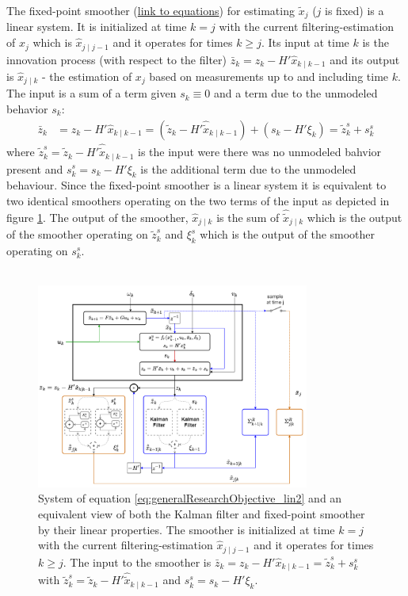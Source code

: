 \documentclass[oneside,12pt]{article}
\begin{document}
%
The fixed-point smoother (\href{https://technionmail-my.sharepoint.com/:b:/g/personal/ron_teichner_campus_technion_ac_il/EQjFqjBlxRxLsoQEzqjmZdAB2D_O3BBw_feZhde7ShqzAA?e=XATenX}{link to equations}) for estimating $\tilde{x}_j$ ($j$ is fixed) is a linear system. It is initialized at time $k=j$ with the current filtering-estimation of $x_j$ which is $\hat{x}_{j \mid j-1}$ and it operates for times $k \geq j$. Its input at time $k$ is the innovation process (with respect to the filter) $\bar{z}_k = z_k - H' \hat{x}_{k \mid k-1}$ and its output is $\hat{x}_{j \mid k}$ - the estimation of $x_j$ based on measurements up to and including time $k$. The input is a sum of a term given $s_k \equiv 0$ and a term due to the unmodeled behavior $s_k$:
%
\begin{equation}
    \begin{split}
        \bar{z}_k &= z_k - H' \hat{x}_{k \mid k-1}
        = (\tilde{z}_k - H' \hat{\tilde{x}}_{k \mid k-1}) + (s_k - H'\xi_{k}) = \tilde{z}^s_k + s^s_k
    \end{split}
\end{equation}
%
where $\tilde{z}^s_k = \tilde{z}_k - H' \hat{\tilde{x}}_{k \mid k-1}$ is the input were there was no unmodeled bahvior present and $s^s_k = s_k - H'\xi_{k}$ is the additional term due to the unmodeled behaviour. Since the fixed-point smoother is a linear system it is equivalent to two identical smoothers operating on the two terms of the input as depicted in figure \ref{fig:Radar-general_discrete_03}. The output of the smoother, $\hat{x}_{j \mid k}$ is the sum of $\hat{\tilde{x}}_{j \mid k}$ which is the output of the smoother operating on $\tilde{z}_k^s$ and $\xi_k^s$ which is the output of the smoother operating on $s_k^s$.\\\\
%
\begin{figure}
    \centering
        \includegraphics[width=0.8\textwidth]{./Radar-general_discrete_03}
        \caption{\label{fig:Radar-general_discrete_03}System of equation \ref{eq:generalResearchObjective_lin2} and an equivalent view of both the Kalman filter and fixed-point smoother by their linear properties. The smoother is initialized at time $k=j$ with the current filtering-estimation $\hat{x}_{j \mid j-1}$ and it operates for times $k \geq j$. The input to the smoother is $\bar{z}_k = z_k - H' \hat{x}_{k \mid k-1} = \tilde{z}^s_k + s^s_k$ with $\tilde{z}^s_k = \tilde{z}_k - H' \hat{\tilde{x}}_{k \mid k-1}$ and $s^s_k = s_k - H'\xi_{k}$.}
\end{figure}
\end{document}
